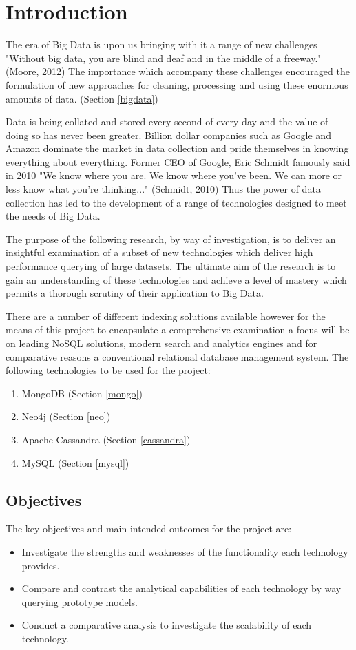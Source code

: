 
\chapter{Introduction}\label{intro}
The era of Big Data is upon us bringing with it a range of new challenges "Without big data, you are blind and deaf and in the middle of a freeway." (Moore, 2012) The importance which accompany these challenges encouraged the formulation of new approaches for cleaning, processing and using these enormous amounts of data. (Section \ref{bigdata})

Data is being collated and stored every second of every day and the value of doing so has never been greater. Billion dollar companies such as Google and Amazon dominate the market in data collection and pride themselves in knowing everything about everything. Former CEO of Google, Eric Schmidt famously said in 2010 "We know where you are. We know where you've been. We can more or less know what you're thinking..." (Schmidt, 2010) Thus the power of data collection has led to the development of a range of technologies designed to meet the needs of Big Data.

The purpose of the following research, by way of investigation, is to deliver an insightful examination of a subset of new technologies which deliver high performance querying of large datasets. The ultimate aim of the research is to gain an understanding of these technologies and achieve a level of mastery which permits a thorough scrutiny of their application to Big Data.

There are a number of different indexing solutions available however for the means of this project to encapsulate a comprehensive examination a focus will be on leading NoSQL solutions, modern search and analytics engines and for comparative reasons a conventional relational database management system. The following technologies to be used for the project: 
\begin{enumerate}
\item MongoDB (Section \ref{mongo})
\item Neo4j (Section \ref{neo})
\item Apache Cassandra (Section \ref{cassandra})
\item MySQL (Section \ref{mysql})
\end{enumerate}

\section{Objectives}
The key objectives and main intended outcomes for the project are:
\begin{itemize}
\item Investigate the strengths and weaknesses of the functionality each technology provides.
\item Compare and contrast the analytical capabilities of each technology by way querying prototype models.
\item Conduct a comparative analysis to investigate the scalability of each technology.
\end{itemize}

